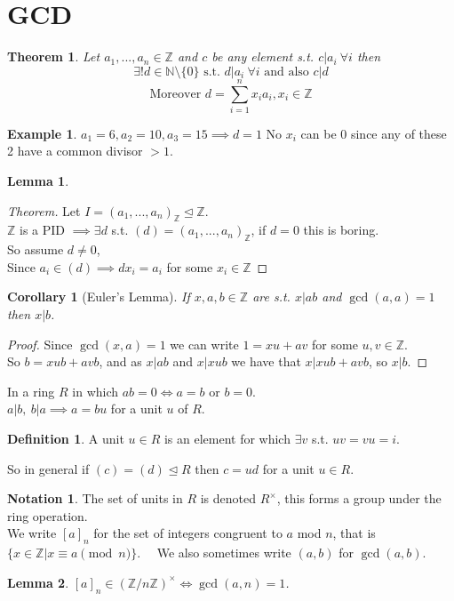 \documentclass{book}
\newtheorem*{thm}{Theorem}
\newtheorem*{lem}{Lemma}
\newtheorem*{cor}{Corollary}
\theoremstyle{definition}
\newtheorem*{defn}{Definition}
\newtheorem*{ex}{Example}
\newtheorem*{nota}{Notation}
\newcommand{\ZZ}{\mathbb{Z}}
\newcommand{\NN}{\mathbb{N}}
\begin{document}
\section{GCD}
\begin{thm}
Let $a_1,...,a_n \in \ZZ$ and $c$ be any element s.t. $c|a_i\ \forall i$ then
$$\exists! d \in \NN\setminus\{0\} \text{ s.t. } d|a_i\ \forall i \text{ and also } c|d$$
$$\text{Moreover }d = \sum_{i=1}^n x_i a_i, x_i \in\ZZ$$
\end{thm}
\begin{ex}
$a_1=6,a_2=10,a_3=15 \implies d=1$ No $x_i$ can be 0 since any of these 2 have a common divisor $> 1$.
\end{ex}
\begin{lem}

\end{lem}
\begin{proof}[Theorem]
Let $I=(a_1,...,a_n)_{\ZZ} \trianglelefteq \ZZ$. \\
$\ZZ$ is a PID $\implies \exists d $ s.t. $(d)=(a_1,...,a_n)_{\ZZ}$, if $d=0$ this is boring.\\
So assume $d\neq 0$,\\
Since $a_i \in(d) \implies dx_i = a_i$ for some $x_i \in \ZZ$
\end{proof}
\begin{cor}[Euler's Lemma]
If $x,a,b \in\ZZ$ are s.t. $x|ab$ and $\gcd(a,a)=1$ then $x|b$.
\end{cor}
\begin{proof}
Since $\gcd(x,a)=1$ we can write $1=xu+av$ for some $u,v\in\ZZ$.\\
So $b=xub+avb$, and as $x|ab$ and $x|xub$ we have that $x|xub+avb$, so $x|b$.
\end{proof}
In a ring $R$ in which $ab=0 \iff a=b$ or $b=0$. \\
$a|b,\ b|a \implies a=bu$ for a unit $u$ of $R$.
\begin{defn}
A unit $u\in R$ is an element for which $\exists v$ s.t. $uv=vu=i$.
\end{defn}
So in general if $(c)=(d) \trianglelefteq R$ then $c=ud$ for a unit $u\in R$.
\begin{nota}
The set of units in $R$ is denoted $R^\times$, this forms a group under the ring operation. \\
We write $[a]_n$ for the set of integers congruent to $a$ mod $n$, that is $\{x \in\ZZ | x \equiv a \pmod{n}\}$. \ \
We also sometimes write $(a,b)$ for $\gcd(a,b)$.
\end{nota}
\begin{lem}
$[a]_n\in (\ZZ /n\ZZ)^\times \iff \gcd(a,n)=1$.
\end{lem}
\end{document}
